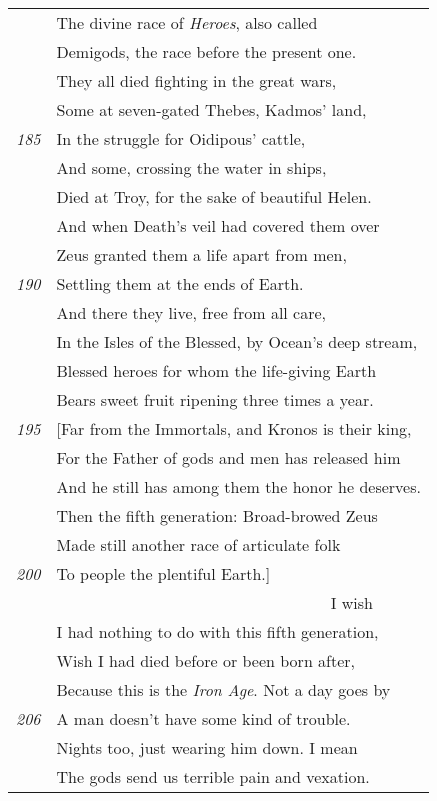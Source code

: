 \scriptsize\begin{tabular}[bht]{rl}
& The divine race of {\em Heroes}, also called \\
& Demigods, the race before the present one. \\
& They all died fighting in the great wars, \\
& Some at seven-gated Thebes, Kadmos' land, \\
\tiny{\em 185}& In the struggle for Oidipous' cattle, \\
& And some, crossing the water in ships, \\
& Died at Troy, for the sake of beautiful Helen. \\
& And when Death's veil had covered them over \\
& Zeus granted them a life apart from men, \\
\tiny{\em 190}& Settling them at the ends of Earth. \\
& And there they live, free from all care, \\
& In the Isles of the Blessed, by Ocean's deep stream, \\
& Blessed heroes for whom the life-giving Earth \\
& Bears sweet fruit ripening three times a year. \\
\tiny{\em 195}& [Far from the Immortals, and Kronos is their king, \\
& For the Father of gods and men has released him \\
& And he still has among them the honor he deserves. \\[1ex]
& Then the fifth generation: Broad-browed Zeus \\
& Made still another race of articulate folk \\
\tiny{\em 200}& To people the plentiful Earth.] \\
\multicolumn{2}{r}{ I wish\ \ \ \ \ \  } \\
& I had nothing to do with this fifth generation, \\
& Wish I had died before or been born after,\\
&Because this is the {\em Iron Age}. Not a day goes by \\
\tiny{\em 206} & A man doesn't have some kind of trouble. \\
& Nights too, just wearing him down. I mean \\
& The gods send us terrible pain and vexation. \\

\end{tabular}
